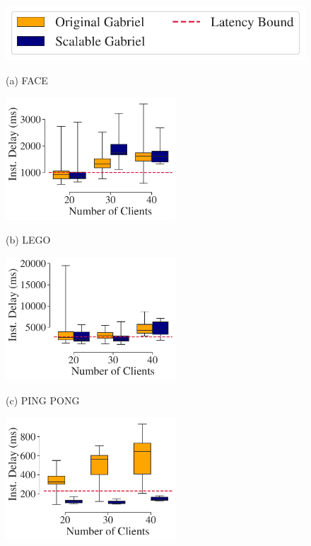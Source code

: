 \begin{figure}[]
  \centering
  \includegraphics[width=0.5\linewidth, trim=0em 0em 0em 0em, clip]{FIGS/fig-sec6-latency-legend.pdf} \\
  \centering
  \begin{turn}{90}{\hspace{0.6in}\small (a) FACE}\end{turn}\hspace{0.2in}\includegraphics[width=2.5in, trim=0em 0em 0em 0em, clip]{FIGS/fig-sec6-latency-face.pdf}
  \begin{turn}{90}{\hspace{0.6in}\small (b)
      LEGO}\end{turn}\hspace{0.2in}\includegraphics[width=2.5in, trim=0em 0em 0em 0em,
    clip]{FIGS/fig-sec6-latency-lego.pdf}\\[0.08in]
  \vspace{0in}
  \begin{turn}{90}{\hspace{0.6in}\small (c) PING PONG}\end{turn}\hspace{0.2in}\includegraphics[width=2.5in, trim=0em 0em 0em 0em, clip]{FIGS/fig-sec6-latency-pingpong.pdf}

\end{figure}
